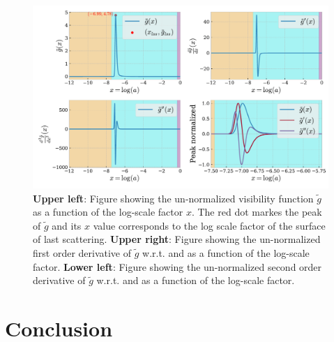 \documentclass[twocolumn]{aastex62}
\begin{document}
\begin{figure}
    \includegraphics[scale = 0.65]{Figures/g_tilde.pdf}
    \caption{\textbf{Upper left}: Figure showing the un-normalized visibility function $\tilde{g}$ as a function of the log-scale factor $x$.
    The red dot markes the peak of $\tilde{g}$ 
    and its $x$ value corresponds to the log scale factor of the surface of last scattering. 
    \textbf{Upper right}: Figure showing the un-normalized first order derivative of $\tilde{g}$ w.r.t. and as a function of the log-scale factor. 
    \textbf{Lower left}: Figure showing the un-normalized second order derivative of $\tilde{g}$ w.r.t. and as a function of the log-scale factor.
    }
    \label{fig:g_tilde}
\end{figure}

\section{Conclusion} \label{sec:Conclusion}




\end{document}
